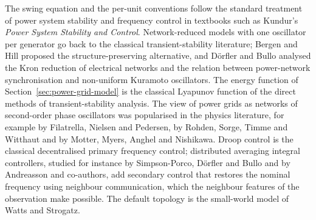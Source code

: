 The swing equation and the per-unit conventions follow the standard treatment
of power system stability and frequency control in textbooks such as Kundur's
\emph{Power System Stability and Control}. Network-reduced models with one
oscillator per generator go back to the classical transient-stability
literature; Bergen and Hill proposed the structure-preserving alternative, and
D\"orfler and Bullo analysed the Kron reduction of electrical networks and the
relation between power-network synchronisation and non-uniform Kuramoto
oscillators. The energy function of Section~\ref{sec:power-grid-model} is the classical
Lyapunov function of the direct methods of transient-stability analysis. The view of power
grids as networks of second-order phase oscillators was popularised in the
physics literature, for example by Filatrella, Nielsen and Pedersen, by Rohden,
Sorge, Timme and Witthaut and by Motter, Myers, Anghel and Nishikawa. Droop
control is the classical decentralised primary frequency control; distributed
averaging integral controllers, studied for instance by Simpson-Porco, D\"orfler
and Bullo and by Andreasson and co-authors, add secondary control that restores
the nominal frequency using neighbour communication, which the neighbour
features of the observation make possible. The default topology is the
small-world model of Watts and Strogatz.

\endgroup
